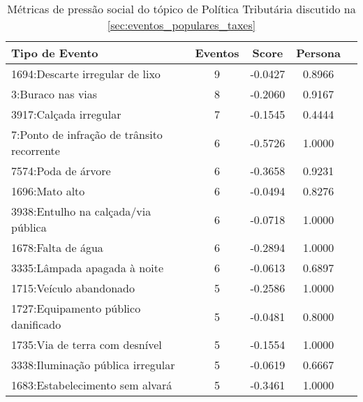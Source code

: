 \begin{table}[htbp]
	\centering
	\caption{Métricas de pressão social do tópico de Política Tributária discutido na \autoref{sec:eventos_populares_taxes}}
	\label{tab:eventos_populares_taxes}
	\begin{tabular}{|l|c|c|c|c|}
		\hline
		\textbf{Tipo de Evento}                               & \textbf{Eventos} & \textbf{Score} & \textbf{Persona} \\
		\hline
		1694:Descarte irregular de lixo                       & 9                & -0.0427        & 0.8966           \\
		\hline
		3:Buraco nas vias                                     & 8                & -0.2060        & 0.9167           \\
		\hline
		3917:Calçada irregular                                & 7                & -0.1545        & 0.4444           \\
		\hline
		7:Ponto de infração de trânsito recorrente            & 6                & -0.5726        & 1.0000           \\
		\hline
		7574:Poda de árvore                                   & 6                & -0.3658        & 0.9231           \\
		\hline
		1696:Mato alto                                        & 6                & -0.0494        & 0.8276           \\
		\hline
		3938:Entulho na calçada/via pública                   & 6                & -0.0718        & 1.0000           \\
		\hline
		1678:Falta de água                                    & 6                & -0.2894        & 1.0000           \\
		\hline
		3335:Lâmpada apagada à noite                          & 6                & -0.0613        & 0.6897           \\
		\hline
		1715:Veículo abandonado                               & 5                & -0.2586        & 1.0000           \\
		\hline
		1727:Equipamento público danificado                   & 5                & -0.0481        & 0.8000           \\
		\hline
		1735:Via de terra com desnível                        & 5                & -0.1554        & 1.0000           \\
		\hline
		3338:Iluminação pública irregular                     & 5                & -0.0619        & 0.6667           \\
		\hline
		1683:Estabelecimento sem alvará                       & 5                & -0.3461        & 1.0000           \\

\end{tabular}
\end{table}
